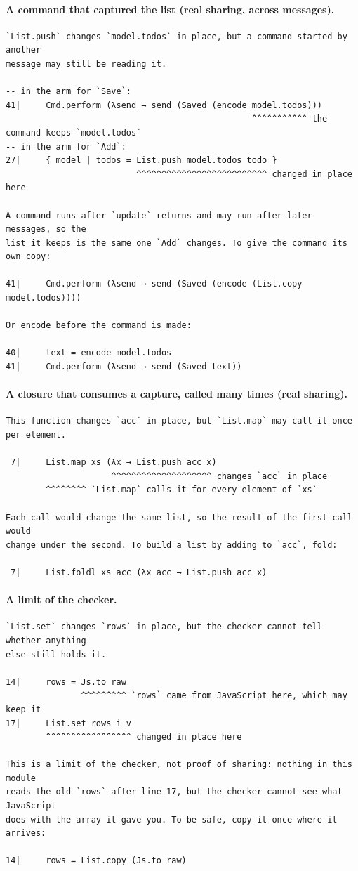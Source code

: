 \paragraph{A command that captured the list (real sharing, across messages).}
\begin{Verbatim}
`List.push` changes `model.todos` in place, but a command started by another
message may still be reading it.

-- in the arm for `Save`:
41|     Cmd.perform (λsend → send (Saved (encode model.todos)))
                                                 ^^^^^^^^^^^ the command keeps `model.todos`
-- in the arm for `Add`:
27|     { model | todos = List.push model.todos todo }
                          ^^^^^^^^^^^^^^^^^^^^^^^^^^ changed in place here

A command runs after `update` returns and may run after later messages, so the
list it keeps is the same one `Add` changes. To give the command its own copy:

41|     Cmd.perform (λsend → send (Saved (encode (List.copy model.todos))))

Or encode before the command is made:

40|     text = encode model.todos
41|     Cmd.perform (λsend → send (Saved text))
\end{Verbatim}

\paragraph{A closure that consumes a capture, called many times (real sharing).}
\begin{Verbatim}
This function changes `acc` in place, but `List.map` may call it once per element.

 7|     List.map xs (λx → List.push acc x)
                     ^^^^^^^^^^^^^^^^^^^^ changes `acc` in place
        ^^^^^^^^ `List.map` calls it for every element of `xs`

Each call would change the same list, so the result of the first call would
change under the second. To build a list by adding to `acc`, fold:

 7|     List.foldl xs acc (λx acc → List.push acc x)
\end{Verbatim}

\paragraph{A limit of the checker.}
\begin{Verbatim}
`List.set` changes `rows` in place, but the checker cannot tell whether anything
else still holds it.

14|     rows = Js.to raw
               ^^^^^^^^^ `rows` came from JavaScript here, which may keep it
17|     List.set rows i v
        ^^^^^^^^^^^^^^^^^ changed in place here

This is a limit of the checker, not proof of sharing: nothing in this module
reads the old `rows` after line 17, but the checker cannot see what JavaScript
does with the array it gave you. To be safe, copy it once where it arrives:

14|     rows = List.copy (Js.to raw)
\end{Verbatim}

